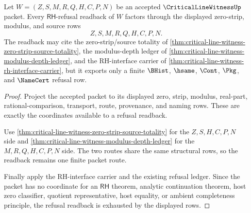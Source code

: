 \begin{theorem}
\label{thm:critical-line-witness-rh-refusal-readback-totality}
Let $W=(Z,S,M,R,Q,H,C,P,N)$ be an accepted $\CriticalLineWitnessUp$ packet. Every $\mathsf{RH}$-refusal readback of $W$ factors through the displayed zero-strip, modulus, and source rows
$$
Z,S,M,R,Q,H,C,P,N.
$$
The readback may cite the zero-strip/source totality of \autoref{thm:critical-line-witness-zero-strip-source-totality}, the modulus-depth ledger of \autoref{thm:critical-line-witness-modulus-depth-ledger}, and the RH-interface carrier of \autoref{thm:critical-line-witness-rh-interface-carrier}, but it exports only a finite $\BHist$, $\hsame$, $\Cont$, $\Pkg$, and $\NameCert$ refusal row.
\end{theorem}
\begin{proof}
Project the accepted packet to its displayed zero, strip, modulus, real-part, rational-comparison, transport, route, provenance, and naming rows. These are exactly the coordinates available to a refusal readback.

Use \autoref{thm:critical-line-witness-zero-strip-source-totality} for the $Z,S,H,C,P,N$ side and \autoref{thm:critical-line-witness-modulus-depth-ledger} for the $M,R,Q,H,C,P,N$ side. The two routes share the same structural rows, so the readback remains one finite packet route.

Finally apply the RH-interface carrier and the existing refusal ledger. Since the packet has no coordinate for an $\mathsf{RH}$ theorem, analytic continuation theorem, host zero classifier, quotient representative, host equality, or ambient completeness principle, the refusal readback is exhausted by the displayed rows.
\end{proof}

